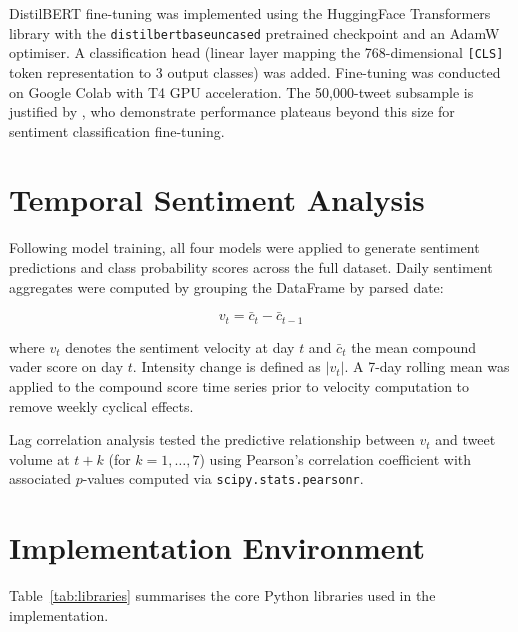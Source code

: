 DistilBERT fine-tuning was implemented using the HuggingFace Transformers library with the \texttt{distilbert\discretionary{-}{}{-}base\discretionary{-}{}{-}uncased} pretrained checkpoint and an AdamW optimiser. A classification head (linear layer mapping the 768-dimensional \texttt{[CLS]} token representation to 3 output classes) was added. Fine-tuning was conducted on Google Colab with T4 GPU acceleration. The 50,000-tweet subsample is justified by \citet{sun2019fine}, who demonstrate performance plateaus beyond this size for sentiment classification fine-tuning.

\section{Temporal Sentiment Analysis}

Following model training, all four models were applied to generate sentiment predictions and class probability scores across the full dataset. Daily sentiment aggregates were computed by grouping the DataFrame by parsed date:

\begin{equation}
  v_t = \bar{c}_t - \bar{c}_{t-1}
  \label{eq:velocity}
\end{equation}

where $v_t$ denotes the sentiment velocity at day $t$ and $\bar{c}_t$ the mean compound \gls{vader} score on day $t$. Intensity change is defined as $|v_t|$. A 7-day rolling mean was applied to the compound score time series prior to velocity computation to remove weekly cyclical effects.

Lag correlation analysis tested the predictive relationship between $v_t$ and tweet volume at $t+k$ (for $k = 1, \ldots, 7$) using Pearson's correlation coefficient with associated $p$-values computed via \texttt{scipy.stats.pearsonr}.

\section{Implementation Environment}

Table~\ref{tab:libraries} summarises the core Python libraries used in the implementation.

